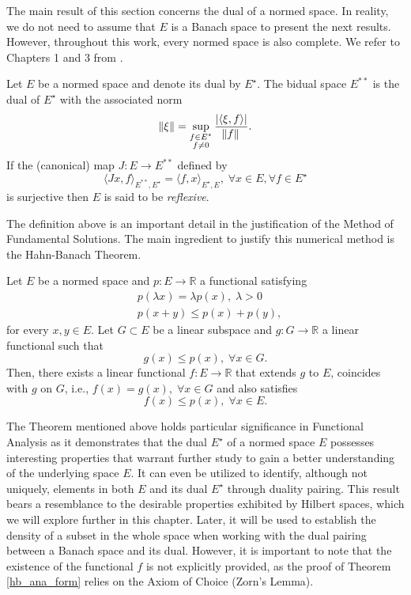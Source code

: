 The main result of this section concerns the dual of a normed space. In reality, we do not need to assume that \(E\) is a Banach space to present the next results. However, throughout this work, every normed space is also complete. We refer to Chapters 1 and 3 from \cite{brezis2011functional}.
\begin{definition}\label{reflexive_space}
    Let \(E\) be a normed space and denote its dual by \(E^\star\). The bidual space \(E^{**}\) is the dual of \(E^\star\) with the associated norm
    \[
        \norm{\xi} = \sup_{\substack{f \in E^\star\\ f \neq 0}}\frac{\abs{\langle \xi, f \rangle}}{\norm*{f}}.
    \]
    If the (canonical) map \(J: E \rightarrow E^{**}\) defined by
    \[
        \langle J x, f \rangle_{E^{**}, E^\star} = \langle f, x \rangle_{E^\star, E}, \; \forall x \in E, \forall f \in E^\star
    \]
    is surjective then \(E\) is said to be \textit{reflexive}.
\end{definition}
The definition above is an important detail in the justification of the Method of Fundamental Solutions. The main ingredient to justify this numerical method is the Hahn-Banach Theorem.
\begin{theorem}\label{hb_ana_form}
    Let \(E\) be a normed space and \(p: E \rightarrow \mathbb{R}\) a functional satisfying
    \begin{align*}
        &p (\lambda x) = \lambda p(x), \; \lambda >0\\
        &p(x+y) \leq p(x) + p(y),
    \end{align*}
    for every \(x, y \in E\). Let \(G \subset E\) be a linear subspace and \(g: G \rightarrow \mathbb{R}\) a linear functional such that
    \[
        g(x) \leq p(x), \; \forall x \in G.
    \]
    Then, there exists a linear functional \(f: E \rightarrow \mathbb{R}\) that extends \(g\) to \(E\), coincides with \(g\) on \(G\), i.e., \(f(x) = g(x), \; \forall x \in G\) and also satisfies
    \[
        f(x) \leq p(x), \; \forall x \in E.
    \]
\end{theorem}
\begin{remark}
    The Theorem mentioned above holds particular significance in Functional Analysis as it demonstrates that the dual \(E^\star\) of a normed space \(E\) possesses interesting properties that warrant further study to gain a better understanding of the underlying space \(E\). It can even be utilized to identify, although not uniquely, elements in both \(E\) and its dual \(E^\star\) through duality pairing. This result bears a resemblance to the desirable properties exhibited by Hilbert spaces, which we will explore further in this chapter. Later, it will be used to establish the density of a subset in the whole space when working with the dual pairing between a Banach space and its dual. However, it is important to note that the existence of the functional \(f\) is not explicitly provided, as the proof of Theorem \ref{hb_ana_form} relies on the Axiom of Choice (Zorn's Lemma).
\end{remark}
